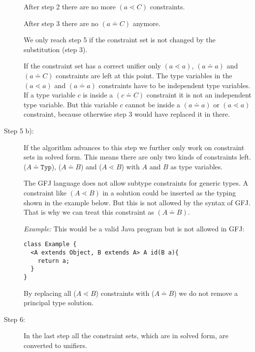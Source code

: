 \documentclass[acmsmall,screen,review]{acmart}
\begin{document}
\begin{description}
After step 2 there are no more $(a \lessdot C)$ constraints.

After step 3 there are no $(a \doteq C)$ anymore.

We only reach step 5 if the constraint set is not changed by the substitution (step 3).


If the constraint set has a correct unifier only $(a \lessdot a)$, $(a \doteq a)$ and $(a \doteq C)$ constraints are left at this point.
The type variables in the $(a \lessdot a)$ and $(a \doteq a)$ constraints have to be independent type variables.
If a type variable $c$ is inside a $(c \doteq C)$ constraint it is not an independent type variable.
But this variable $c$ cannot be inside a $(a \doteq a)$ or $(a \lessdot a)$ constraint, because otherwise step 3 would have replaced it in there.


\item[Step 5 b):]
If the algorithm advances to this step we further only work on constraint sets in solved form.
This means there are only two kinds of constraints left.
($A \doteq \texttt{Typ}$), ($A \doteq B$) and ($A \lessdot B$) with $A$ and $B$ as type variables.


The GFJ language does not allow subtype constraints for generic types.
A constraint like $(A \lessdot B)$ in a solution could be inserted as the typing shown in the example below.
But this is not allowed by the syntax of GFJ.
That is why we can treat this constraint as $(A \doteq B)$.


\textit{Example:}
This would be a valid Java program but is not allowed in GFJ:
\begin{lstlisting}
class Example {
  <A extends Object, B extends A> A id(B a){
    return a;
  }
}
\end{lstlisting}

By replacing all ($A \lessdot B$) constraints with ($A \doteq B$) we do not remove a principal type solution.

\item[Step 6:]
In the last step all the constraint sets, which are in solved form, are converted to unifiers.


\end{description}
\end{document}
